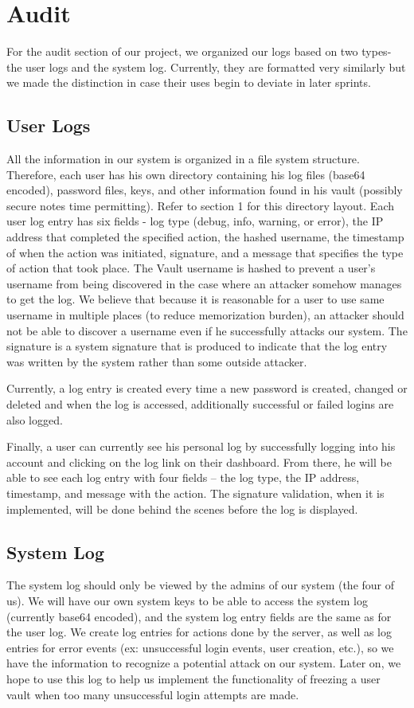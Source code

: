\documentclass{article}
\begin{document}
\section{Audit}
For the audit section of our project, we organized our logs based on two types- the user logs and the system log. Currently, they are formatted very similarly but we made the distinction in case their uses begin to deviate in later sprints.
\subsection{User Logs}
\par All the information in our system is organized in a file system structure. Therefore, each user has his own directory containing his log files (base64 encoded), password files, keys, and other information found in his vault (possibly secure notes time permitting). Refer to section 1 for this directory layout. Each user log entry has six fields - log type (debug, info, warning, or error), the IP address that completed the specified action, the hashed username, the timestamp of when the action was initiated, signature, and a message that specifies the type of action that took place. The Vault username is hashed to prevent a user's username from being discovered in the case where an attacker somehow manages to get the log. We believe that because it is reasonable for a user to use same username in multiple places (to reduce memorization burden), an attacker should not be able to discover a username even if he successfully attacks our system. The signature is a system signature that is produced to indicate that the log entry was written by the system rather than some outside attacker.

\par Currently, a log entry is created every time a new password is created, changed or deleted and when the log is accessed, additionally successful or failed logins are also logged.

\par Finally, a user can currently see his personal log by successfully logging into his account and clicking on the log link on their dashboard. From there, he will be able to see each log entry with four fields – the log type, the IP address, timestamp, and message with the action. The signature validation, when it is implemented, will be done behind the scenes before the log is displayed.

\subsection{System Log}
The system log should only be viewed by the admins of our system (the four of us). We will have our own system keys to be able to access the system log (currently base64 encoded), and the system log entry fields are the same as for the user log. We create log entries for actions done by the server, as well as log entries for error events (ex: unsuccessful login events, user creation, etc.), so we have the information to recognize a potential attack on our system. Later on, we hope to use this log to help us implement the functionality of freezing a user vault when too many unsuccessful login attempts are made.
\end{document}
